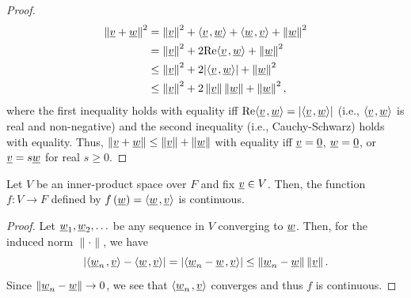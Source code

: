 \begin{proof}
\begin{equation*}
\begin{split}
\left\| \underline{v} + \underline{w} \right\|^2
&= \left\| \underline{v} \right\|^2 + {\left\langle  \underline{v}  \mskip2mu ,  \underline{w}  \right\rangle} + {\left\langle  \underline{w}  \mskip2mu ,  \underline{v}  \right\rangle} + \left\| \underline{w} \right\|^2 \\
&= \left\| \underline{v} \right\|^2 + 2 \mathrm{Re} {\left\langle  \underline{v}  \mskip2mu ,  \underline{w}  \right\rangle} + \left\| \underline{w} \right\|^2 \\
&\leq \left\| \underline{v} \right\|^2 + 2 |{\left\langle  \underline{v}  \mskip2mu ,  \underline{w}  \right\rangle}| + \left\| \underline{w} \right\|^2 \\
&\leq \left\| \underline{v} \right\|^2 + 2 \left\| \underline{v} \right\| \left\| \underline{w} \right\| + \left\| \underline{w} \right\|^2 ,
\end{split}
\end{equation*}
where the first inequality holds with equality iff $\mathrm{Re} {\left\langle  \underline{v}  \mskip2mu ,  \underline{w}  \right\rangle} = | {\left\langle  \underline{v}  \mskip2mu ,  \underline{w}  \right\rangle}|$ (i.e., ${\left\langle \underline{v} \mskip2mu , \underline{w} \right\rangle}$ is real and non-negative) and the second inequality (i.e., Cauchy-Schwarz) holds with equality.
Thus, $\left\| \underline{v} + \underline{w} \right\| \leq \left\| \underline{v} \right\| + \left\| \underline{w} \right\|$ with equality iff $\underline{v} = \underline{0}$, $\underline{w}=\underline{0}$, or $\underline{v} = s \underline{w}$ for real $s\geq 0$.
\end{proof}


\begin{theorem}
\label{theorem:InnerProductContinuous}
Let $V$ be an inner-product space over $F$ and fix $\underline v\in V$.
Then, the function $f \colon V \rightarrow F$ defined by $f \left( \underline{w} \right) = {\left\langle  \underline{w}  \mskip2mu ,  \underline{v}  \right\rangle}$ is continuous.
\end{theorem}
\begin{proof}
Let $\underline{w}_1, \underline{w}_2, \ldots$ be any sequence in $V$ converging to $\underline{w}$.
Then, for the induced norm $\| \cdot \|$, we have
\begin{equation*}
\left| {\left\langle  \underline{w}_n  \mskip2mu ,  \underline{v}  \right\rangle}
- {\left\langle  \underline{w}  \mskip2mu ,  \underline{v}  \right\rangle} \right|
= \left| {\left\langle  \underline{w}_n - \underline{w}  \mskip2mu ,  \underline{v}  \right\rangle} \right|
\leq \left\| \underline{w}_n - \underline{w} \right\| \left\| \underline{v} \right\|.
\end{equation*}
Since $\left\| \underline{w}_n - \underline{w} \right\| \rightarrow 0$, we see that ${\left\langle  \underline{w}_n  \mskip2mu ,  \underline{v}  \right\rangle}$ converges and thus $f$ is continuous.
\end{proof}



